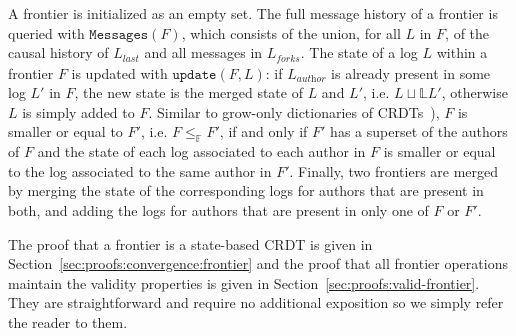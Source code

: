 \documentclass[9pt, oneside]{article}   	%
\begin{document}
A frontier is initialized as an empty set. The full message history of a frontier is queried with $\texttt{Messages}(F)$, which consists of the union, for all $L$ in $F$, of the causal history of $L_\textit{last}$ and all messages in $L_\textit{forks}$. The state of a log $L$ within a frontier $F$ is updated with $\texttt{update}(F,L)$: if $L_\textit{author}$ is already present in some log $L'$ in $F$, the new state is the merged state of $L$ and $L'$, i.e. $L \sqcup\mathds{L} L'$, otherwise $L$ is simply added to $F$. Similar to grow-only dictionaries of CRDTs~\cite{lavoie2023inftypset, lavoie2023gocledger}), $F$ is smaller or equal to $F'$, i.e.  $F \leq_\mathds{F} F'$, if and only if $F'$ has a superset of the authors of $F$ and the state of each log associated to each author in $F$ is smaller or equal to the log associated to the same author in $F'$. Finally, two frontiers are merged by merging the state of the corresponding logs for authors that are present in both, and adding the logs for authors that are present in only one of $F$ or $F'$.

The proof that a frontier is a state-based CRDT is given in Section~\ref{sec:proofs:convergence:frontier} and the proof that all frontier operations maintain the validity properties is given in Section~\ref{sec:proofs:valid-frontier}. They are straightforward and require no additional exposition so we simply refer the reader to them.
\end{document}
